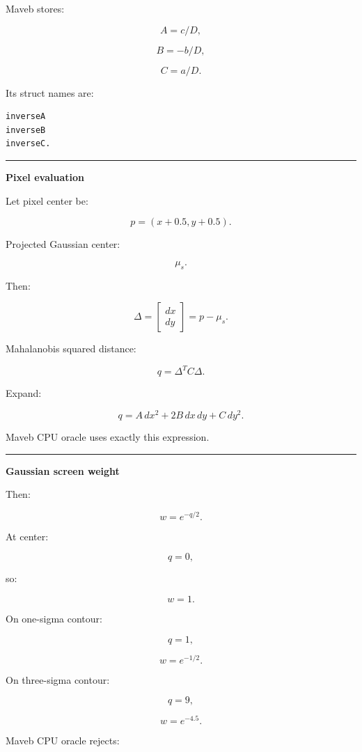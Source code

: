 Maveb stores:

\[
A=
c/D,
\]

\[
B=
-b/D,
\]

\[
C=
a/D.
\]

Its struct names are:

\protect{}\label{cgxb8q}%
\begin{verbatim}
inverseA
inverseB
inverseC.
\end{verbatim}

\begin{center}\rule{0.5\linewidth}{0.5pt}\end{center}

\textbf{Pixel evaluation}

Let pixel center be:

\[
p=
(x+0.5,y+0.5).
\]

Projected Gaussian center:

\[
\mu_s.
\]

Then:

\[
\Delta=
\begin{bmatrix}
dx\\dy
\end{bmatrix}
=
p-\mu_s.
\]

Mahalanobis squared distance:

\[
q=
\Delta^T
C
\Delta.
\]

Expand:

\[
\boxed{
q=
A\,dx^2
+
2B\,dx\,dy
+
C\,dy^2.
}
\]

Maveb CPU oracle uses exactly this expression.

\begin{center}\rule{0.5\linewidth}{0.5pt}\end{center}

\textbf{Gaussian screen weight}

Then:

\[
\boxed{
w=
e^{-q/2}.
}
\]

At center:

\[
q=0,
\]

so:

\[
w=1.
\]

On one-sigma contour:

\[
q=1,
\]

\[
w=e^{-1/2}.
\]

On three-sigma contour:

\[
q=9,
\]

\[
w=e^{-4.5}.
\]

Maveb CPU oracle rejects:

